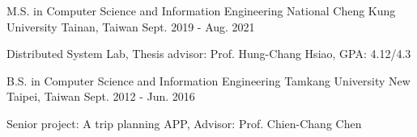 

\begin{cventries}

  \cventry
    {M.S. in Computer Science and Information Engineering} %
    {National Cheng Kung University} %
    {Tainan, Taiwan} %
    {Sept. 2019 - Aug. 2021} %
    {
      \begin{cvitems} %
        \item {Distributed System Lab, Thesis advisor: Prof. Hung-Chang Hsiao, GPA: 4.12/4.3}
      \end{cvitems}
    }

  \cventry
    {B.S. in Computer Science and Information Engineering} %
    {Tamkang University} %
    {New Taipei, Taiwan} %
    {Sept. 2012 - Jun. 2016} %
    {
      \begin{cvitems} %
        \item {Senior project: A trip planning APP, Advisor: Prof. Chien-Chang Chen}
      \end{cvitems}
    }

\end{cventries}
